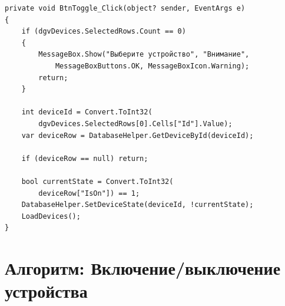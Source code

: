 \documentclass[oneside,a4paper,14pt]{extarticle}
\begin{document}
\newpage
\begin{verbatim}
private void BtnToggle_Click(object? sender, EventArgs e)
{
    if (dgvDevices.SelectedRows.Count == 0)
    {
        MessageBox.Show("Выберите устройство", "Внимание",
            MessageBoxButtons.OK, MessageBoxIcon.Warning);
        return;
    }

    int deviceId = Convert.ToInt32(
        dgvDevices.SelectedRows[0].Cells["Id"].Value);
    var deviceRow = DatabaseHelper.GetDeviceById(deviceId);

    if (deviceRow == null) return;

    bool currentState = Convert.ToInt32(
        deviceRow["IsOn"]) == 1;
    DatabaseHelper.SetDeviceState(deviceId, !currentState);
    LoadDevices();
}
\end{verbatim}

\section*{Алгоритм: Включение/выключение устройства}
\end{document}
